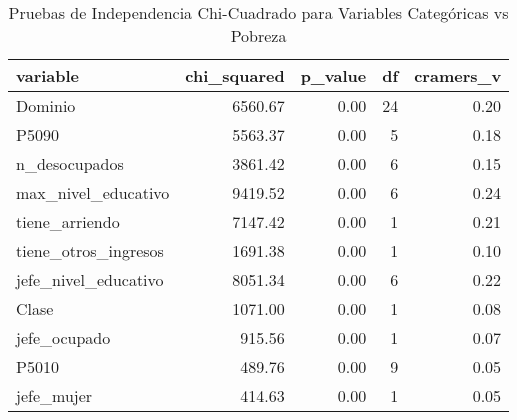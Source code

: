 \begin{table}[ht]
\centering
\begin{tabular}{lrrrr}
  \toprule
variable & chi\_squared & p\_value & df & cramers\_v \\ 
  \midrule
Dominio & 6560.67 & 0.00 &  24 & 0.20 \\ 
  P5090 & 5563.37 & 0.00 &   5 & 0.18 \\ 
  n\_desocupados & 3861.42 & 0.00 &   6 & 0.15 \\ 
  max\_nivel\_educativo & 9419.52 & 0.00 &   6 & 0.24 \\ 
  tiene\_arriendo & 7147.42 & 0.00 &   1 & 0.21 \\ 
  tiene\_otros\_ingresos & 1691.38 & 0.00 &   1 & 0.10 \\ 
  jefe\_nivel\_educativo & 8051.34 & 0.00 &   6 & 0.22 \\ 
  Clase & 1071.00 & 0.00 &   1 & 0.08 \\ 
  jefe\_ocupado & 915.56 & 0.00 &   1 & 0.07 \\ 
  P5010 & 489.76 & 0.00 &   9 & 0.05 \\ 
  jefe\_mujer & 414.63 & 0.00 &   1 & 0.05 \\ 
   \bottomrule
\end{tabular}
\caption{Pruebas de Independencia Chi-Cuadrado para Variables Categóricas vs Pobreza} 
\label{tab:chi_squared_tests}
\end{table}
